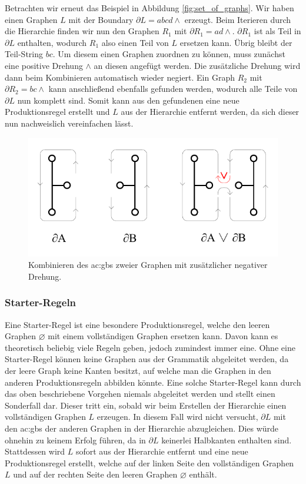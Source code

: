 Betrachten wir erneut das Beispiel in Abbildung \ref{fig:set_of_graphs}. Wir haben einen Graphen \(L\) mit der Boundary \(\partial L = abcd\wedge \) erzeugt.
Beim Iterieren durch die Hierarchie finden wir nun den Graphen \(R_1\) mit \(\partial R_1 = ad\wedge \). \(\partial R_1\) ist als Teil in \(\partial L \)
enthalten, wodurch \(R_1\) also einen Teil von \(L\) ersetzen kann. Übrig bleibt der Teil-String \(bc\). Um diesem einen Graphen zuordnen zu können,
muss zunächst eine positive Drehung \(\wedge \) an diesen angefügt werden. Die zusätzliche Drehung wird dann beim Kombinieren automatisch wieder negiert.
Ein Graph \(R_2\) mit \(\partial R_2 = bc\wedge \) kann anschließend ebenfalls gefunden werden, wodurch alle Teile von \(\partial L\) nun komplett sind. Somit kann
aus den gefundenen eine neue Produktionsregel erstellt und \(L\) aus der Hierarchie entfernt werden, da sich dieser nun nachweislich vereinfachen lässt.

\begin{figure}[t]
    \centering
    \includegraphics[width=(\imgWidth*3/4)]{images/splicing.pdf}
    \caption{Kombinieren des \gls{ac:gbs} zweier Graphen mit zusätzlicher negativer Drehung.}
    \label{fig:splicing}
\end{figure}

\subsubsection{Starter-Regeln}
Eine Starter-Regel ist eine besondere Produktionsregel, welche den leeren Graphen \(\varnothing\) mit einem vollständigen Graphen ersetzen kann. Davon
kann es theoretisch beliebig viele Regeln geben, jedoch zumindest immer eine. Ohne eine Starter-Regel können keine Graphen aus der Grammatik abgeleitet werden,
da der leere Graph keine Kanten besitzt, auf welche man die Graphen in den anderen Produktionsregeln abbilden könnte. Eine solche Starter-Regel kann durch
das oben beschriebene Vorgehen niemals abgeleitet werden und stellt einen Sonderfall dar. Dieser tritt ein, sobald wir beim Erstellen der Hierarchie
einen vollständigen Graphen \(L\) erzeugen. In diesem Fall wird nicht versucht, \(\partial L\) mit den \gls{ac:gbs} der anderen Graphen in der Hierarchie
abzugleichen. Dies würde ohnehin zu keinem Erfolg führen, da in \(\partial L\) keinerlei Halbkanten enthalten sind. Stattdessen wird \(L\) sofort aus der
Hierarchie entfernt und eine neue Produktionsregel erstellt, welche auf der linken Seite den vollständigen Graphen \(L\) und auf der rechten Seite den
leeren Graphen \(\varnothing\) enthält.

